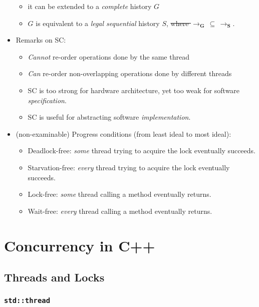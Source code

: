 \documentclass[twocolumn,landscape,10pt]{article}
\theoremstyle{definition}
\begin{document}
\begin{itemize}
        \begin{itemize}
            \item it can be extended to a \emph{complete} history $G$
            \item $G$ is equivalent to a \emph{legal sequential} history $S$,
                \sout{where $\pmb{\rightarrow_G}\,\subseteq\,\pmb{\rightarrow_S}$}.
        \end{itemize} 
    \item Remarks on SC:
        \begin{itemize}
            \item \emph{Cannot} re-order operations done by the same thread
            \item \emph{Can} re-order non-overlapping operations done by
                different threads
            \item SC is too strong for hardware architecture, 
                yet too weak for software \emph{specification}.
            \item SC is useful for abstracting software \emph{implementation}.
        \end{itemize} 
    \item (non-examinable) Progress conditions (from least ideal to most ideal):
        \begin{itemize}
            \item Deadlock-free: \emph{some} thread trying to acquire the lock
                eventually succeeds.
            \item Starvation-free: \emph{every} thread trying to acquire the lock
                eventually succeeds.
            \item Lock-free: \emph{some} thread calling a method
                eventually returns.
            \item Wait-free: \emph{every} thread calling a method
                eventually returns.
        \end{itemize} 
\end{itemize} 

\newpage
\section{Concurrency in C++}

\subsection{Threads and Locks}

\subsubsection{\texttt{std::thread}}
\end{document}
